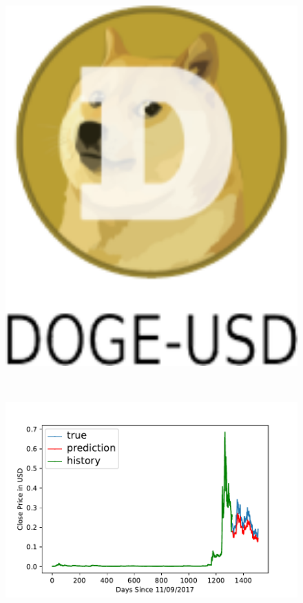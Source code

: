 \begin{figure}[p]
\begin{minipage}{.05\textwidth}
\includegraphics[width=1.0\textwidth]{images/doge-usd.png}
\end{minipage}
\ \
\begin{minipage}{.4\textwidth}
\includegraphics[width=1.0\textwidth]{images/DOGE-USD-prediction-model.pdf}

\end{minipage}
\end{figure}
